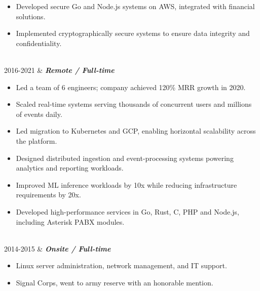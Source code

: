 \documentclass[]{cv-mauri}
\begin{document}
\begin{tabularcv}
			\begin{itemize}
				\item Developed secure Go and Node.js systems on AWS, integrated with financial solutions.
				\item Implemented cryptographically secure systems to ensure data integrity and confidentiality.
			\end{itemize}
					\\[\vspacepar]

    2016-2021   &   
                    \textbf{\textit{Remote / Full-time}}
            \begin{itemize}
            	\item Led a team of 6 engineers; company achieved 120\% MRR growth in 2020.
            	\item Scaled real-time systems serving thousands of concurrent users and millions of events daily.
            	\item Led migration to Kubernetes and GCP, enabling horizontal scalability across the platform.
            	\item Designed distributed ingestion and event-processing systems powering analytics and reporting workloads.
            	\item Improved ML inference workloads by 10x while reducing infrastructure requirements by 20x.
            	\item Developed high-performance services in Go, Rust, C, PHP and Node.js, including Asterisk PABX modules.
			\end{itemize}

		    \\[\vspacepar]
	2014-2015   &   
					\textbf{\textit{Onsite / Full-time}}

			\begin{itemize}
				\item Linux server administration, network management, and IT support.
				\item Signal Corps, went to army reserve with an honorable mention.
			\end{itemize}
\end{tabularcv}
\end{document}

